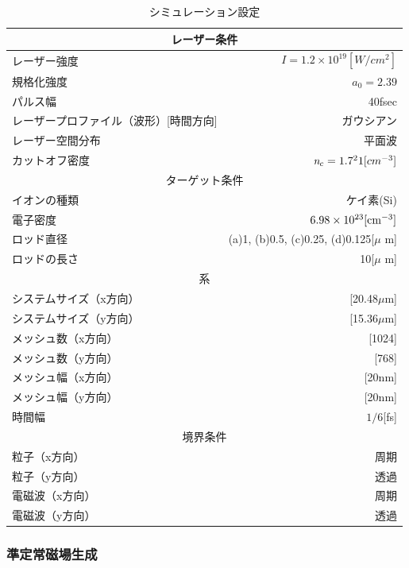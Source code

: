 \documentclass[a4paper,11pt,titlepage]{jarticle}
\numberwithin{equation}{section} %
\begin{document}
  \begin{table}[H]
    \begin{center}
      \caption{シミュレーション設定}
    \begin{tabular}{|l|r|} \hline
      \multicolumn{2}{|c|}{レーザー条件} \\ \hline
      レーザー強度 & $\textit{I}=1.2\times  10^{19}[W/cm^2]$ \\ 
      規格化強度 & $\textit{a} _0 = 2.39$ \\
      パルス幅 & 40fsec \\ 
      レーザープロファイル（波形）[時間方向] & ガウシアン \\
      レーザー空間分布 & 平面波 \\
      カットオフ密度 & $\textit{n} _c = 1.7 \time 10^21 [cm^{-3}]$ \\\hline
      \multicolumn{2}{|c|}{ターゲット条件} \\ \hline
      イオンの種類 & ケイ素(Si) \\
      電子密度 &$6.98 \times  10 ^{23} [\rm{cm}^{-3}]$ \\
      ロッド直径 & (a)1, (b)0.5, (c)0.25, (d)0.125[$\mu$ m] \\
      ロッドの長さ & 10[$\mu$ m]  \\ \hline
      \multicolumn{2}{|c|}{系} \\ \hline
      システムサイズ（x方向） & [20.48$\mu $m] \\
      システムサイズ（y方向） & [15.36$\mu $m] \\
      メッシュ数（x方向） & [1024] \\
      メッシュ数（y方向） & [768] \\
      メッシュ幅（x方向） & [20nm] \\
      メッシュ幅（y方向） & [20nm] \\
      時間幅 & $1/6$[fs] \\ \hline
      \multicolumn{2}{|c|}{境界条件} \\ \hline
      粒子（x方向） & 周期 \\
      粒子（y方向） & 透過 \\
      電磁波（x方向） & 周期 \\
      電磁波（y方向） & 透過 \\ \hline
    \end{tabular}
    \end{center}
    \end{table}

    \subsubsection{準定常磁場生成}
\end{document}
